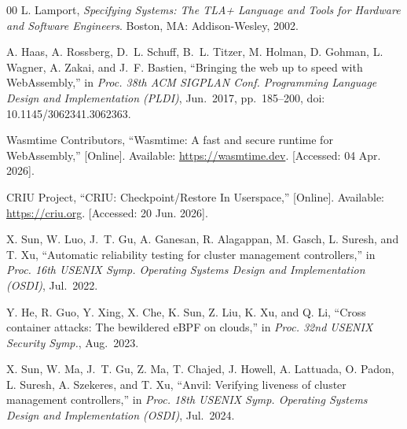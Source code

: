 \documentclass[conference]{IEEEtran}
\begin{document}
\begin{thebibliography}{00}
L. Lamport, \textit{Specifying Systems: The TLA+ Language and Tools for Hardware and Software Engineers}. Boston, MA: Addison-Wesley, 2002.

A. Haas, A. Rossberg, D.~L. Schuff, B.~L. Titzer, M. Holman, D. Gohman, L. Wagner, A. Zakai, and J.~F. Bastien, ``Bringing the web up to speed with WebAssembly,'' in \textit{Proc. 38th ACM SIGPLAN Conf. Programming Language Design and Implementation (PLDI)}, Jun.\ 2017, pp.~185--200, doi: 10.1145/3062341.3062363.

Wasmtime Contributors, ``Wasmtime: A fast and secure runtime for WebAssembly,'' [Online]. Available: \url{https://wasmtime.dev}. [Accessed: 04 Apr. 2026].

CRIU Project, ``CRIU: Checkpoint/Restore In Userspace,'' [Online]. Available: \url{https://criu.org}. [Accessed: 20 Jun. 2026].

X. Sun, W. Luo, J.~T. Gu, A. Ganesan, R. Alagappan, M. Gasch, L. Suresh, and T. Xu, ``Automatic reliability testing for cluster management controllers,'' in \textit{Proc. 16th USENIX Symp. Operating Systems Design and Implementation (OSDI)}, Jul.\ 2022.

Y. He, R. Guo, Y. Xing, X. Che, K. Sun, Z. Liu, K. Xu, and Q. Li, ``Cross container attacks: The bewildered eBPF on clouds,'' in \textit{Proc. 32nd USENIX Security Symp.}, Aug.\ 2023.

X. Sun, W. Ma, J.~T. Gu, Z. Ma, T. Chajed, J. Howell, A. Lattuada, O. Padon, L. Suresh, A. Szekeres, and T. Xu, ``Anvil: Verifying liveness of cluster management controllers,'' in \textit{Proc. 18th USENIX Symp. Operating Systems Design and Implementation (OSDI)}, Jul.\ 2024.

\end{thebibliography}
\end{document}
